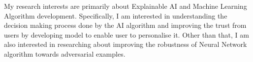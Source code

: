 

\begin{cvparagraph}
	My research interests are primarily about Explainable AI and Machine Learning Algorithm development. Specifically, I am interested in understanding the decision making process done by the AI algorithm and improving the trust from users by developing model to enable user to personalise it. Other than that, I am also interested in researching about improving the robustness of Neural Network algorithm towards adversarial examples.
	
\end{cvparagraph}
